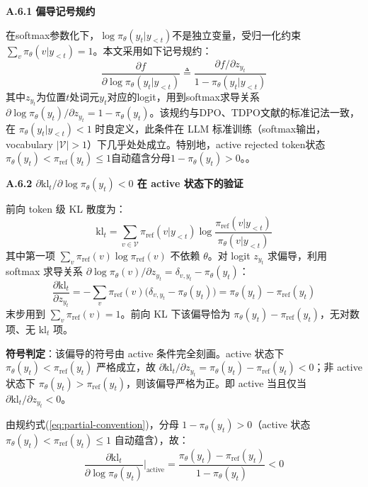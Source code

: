 \documentclass[lettersize,journal]{IEEEtran}
\begin{document}
\textbf{A.6.1 偏导记号规约}

在softmax参数化下，$\log\pi_\theta(y_t|y_{<t})$不是独立变量，受归一化约束$\sum_v \pi_\theta(v|y_{<t}) = 1$。本文采用如下记号规约：
\begin{equation}\label{eq:partial-convention}
\frac{\partial f}{\partial \log\pi_\theta(y_t|y_{<t})} \triangleq \frac{\partial f/\partial z_{y_t}}{1 - \pi_\theta(y_t|y_{<t})}
\end{equation}
其中$z_{y_t}$为位置$t$处词元$y_t$对应的logit，用到softmax求导关系$\partial \log\pi_\theta(y_t)/\partial z_{y_t} = 1 - \pi_\theta(y_t)$。该规约与DPO\cite{rafailov2023direct}、TDPO\cite{zeng2024token}文献的标准记法一致，在 $\pi_\theta(y_t|y_{<t}) < 1$ 时良定义，此条件在 LLM 标准训练（softmax输出，vocabulary $|\mathcal{V}| > 1$）下几乎处处成立。特别地，active rejected token状态$\pi_\theta(y_t) < \pi_{\text{ref}}(y_t) \leq 1$自动蕴含分母$1 - \pi_\theta(y_t) > 0$。。

\textbf{A.6.2 $\partial \text{kl}_t/\partial \log\pi_\theta(y_t) < 0$ 在 active 状态下的验证}
 
前向 token 级 KL 散度为：
\begin{equation}
\text{kl}_t = \sum_{v \in \mathcal{V}} \pi_{\text{ref}}(v|y_{<t}) \log\frac{\pi_{\text{ref}}(v|y_{<t})}{\pi_\theta(v|y_{<t})}
\end{equation}
其中第一项 $\sum_v \pi_{\text{ref}}(v)\log\pi_{\text{ref}}(v)$ 不依赖 $\theta$。对 logit $z_{y_t}$ 求偏导，利用 softmax 求导关系 $\partial \log\pi_\theta(v)/\partial z_{y_t} = \delta_{v,y_t} - \pi_\theta(y_t)$：
\begin{equation}\label{eq:dkl-dz}
\frac{\partial \text{kl}_t}{\partial z_{y_t}} = -\sum_v \pi_{\text{ref}}(v)\bigl(\delta_{v,y_t} - \pi_\theta(y_t)\bigr) = \pi_\theta(y_t) - \pi_{\text{ref}}(y_t)
\end{equation}
末步用到 $\sum_v \pi_{\text{ref}}(v) = 1$。前向 KL 下该偏导恰为 $\pi_\theta(y_t) - \pi_{\text{ref}}(y_t)$，无对数项、无 $\text{kl}_t$ 项。
 
\textbf{符号判定}：该偏导的符号由 active 条件完全刻画。active 状态下 $\pi_\theta(y_t) < \pi_{\text{ref}}(y_t)$ 严格成立，故 $\partial \text{kl}_t/\partial z_{y_t} = \pi_\theta(y_t) - \pi_{\text{ref}}(y_t) < 0$；非 active 状态下 $\pi_\theta(y_t) > \pi_{\text{ref}}(y_t)$，则该偏导严格为正。即 active 当且仅当 $\partial \text{kl}_t/\partial z_{y_t} < 0$。
 
由规约式(\ref{eq:partial-convention})，分母 $1 - \pi_\theta(y_t) > 0$（active 状态 $\pi_\theta(y_t) < \pi_{\text{ref}}(y_t) \leq 1$ 自动蕴含），故：
\begin{equation}
\frac{\partial \text{kl}_t}{\partial \log\pi_\theta(y_t)}\bigg|_{\text{active}} = \frac{\pi_\theta(y_t) - \pi_{\text{ref}}(y_t)}{1 - \pi_\theta(y_t)} < 0
\end{equation}
\end{document}
